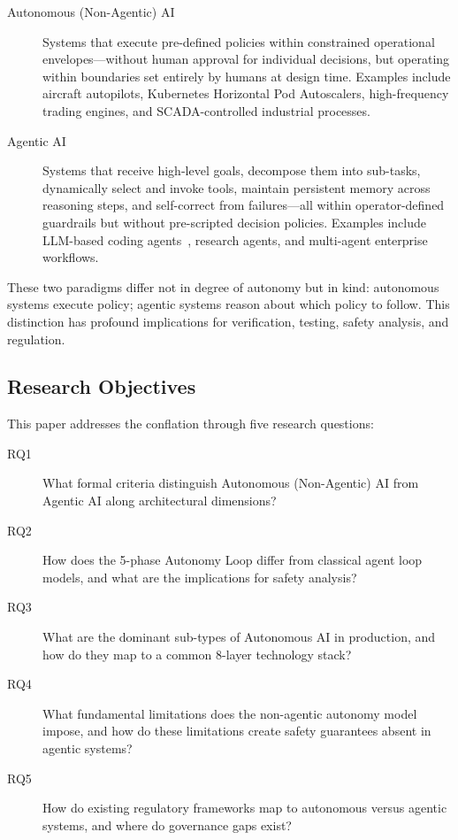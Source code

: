 \documentclass[12pt, a4paper]{article}
\begin{document}
\begin{description}
    \item[Autonomous (Non-Agentic) AI] Systems that execute pre-defined policies within constrained operational envelopes---without human approval for individual decisions, but operating within boundaries set entirely by humans at design time. Examples include aircraft autopilots, Kubernetes Horizontal Pod Autoscalers, high-frequency trading engines, and SCADA-controlled industrial processes.
    \item[Agentic AI] Systems that receive high-level goals, decompose them into sub-tasks, dynamically select and invoke tools, maintain persistent memory across reasoning steps, and self-correct from failures---all within operator-defined guardrails but without pre-scripted decision policies. Examples include LLM-based coding agents~\citep{mahdi2026agentic}, research agents, and multi-agent enterprise workflows.
\end{description}

These two paradigms differ not in degree of autonomy but in kind: autonomous systems execute policy; agentic systems reason about which policy to follow. This distinction has profound implications for verification, testing, safety analysis, and regulation.

\subsection{Research Objectives}
This paper addresses the conflation through five research questions:

\begin{description}
    \item[RQ1] What formal criteria distinguish Autonomous (Non-Agentic) AI from Agentic AI along architectural dimensions?
    \item[RQ2] How does the 5-phase Autonomy Loop differ from classical agent loop models, and what are the implications for safety analysis?
    \item[RQ3] What are the dominant sub-types of Autonomous AI in production, and how do they map to a common 8-layer technology stack?
    \item[RQ4] What fundamental limitations does the non-agentic autonomy model impose, and how do these limitations create safety guarantees absent in agentic systems?
    \item[RQ5] How do existing regulatory frameworks map to autonomous versus agentic systems, and where do governance gaps exist?
\end{description}
\end{document}
